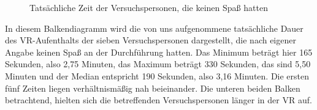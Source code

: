 \documentclass{Paper}
\begin{document}
	\begin{figure}[H]
  \caption{Tatsächliche Zeit der Versuchspersonen, die keinen Spaß hatten}
  \label{ZeitKeinSpass}
	\end{figure}
In diesem Balkendiagramm wird die von uns aufgenommene tatsächliche Dauer des VR-Aufenthalts der sieben Versuchspersonen dargestellt, die nach eigener Angabe keinen Spaß an der Durchführung hatten. Das Minimum beträgt hier 165 Sekunden, also 2,75 Minuten, das Maximum beträgt 330 Sekunden, das sind 5,50 Minuten und der Median entspricht 190 Sekunden, also 3,16 Minuten. Die ersten fünf Zeiten liegen verhältnismäßig nah beieinander. Die unteren beiden Balken betrachtend, hielten sich die betreffenden Versuchspersonen länger in der VR auf.
\end{document}
